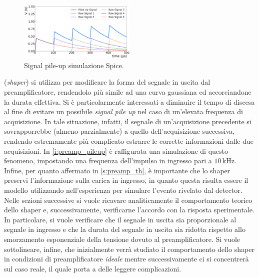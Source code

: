 \documentclass[a4paper,11pt]{article} %
\begin{document}
\begin{figure}
	\centering
	\includegraphics[width=0.5\textwidth]{../Plots/PreAmp/signal_pileup.png}
	\caption{\small Signal pile-up simulazione Spice.}
	\label{i:preamp_pileup}
\end{figure}

(\textit{shaper}) si utilizza per modificare la forma del segnale in uscita dal preamplificatore, rendendolo più simile
ad una curva gaussiana ed accorciandone la durata effettiva. Si è particolarmente interessati a diminuire il tempo di
discesa al fine di evitare un possibile \textit{signal pile up} nel caso di un'elevata frequenza di acquisizione. In
tale situazione, infatti, il segnale di un'acquisizione precedente si sovrapporrebbe (almeno parzialmente) a quello
dell'acquisizione successiva, rendendo estremamente più complicato estrarre le corrette informazioni dalle due
acquisizioni. In \autoref{i:preamp_pileup} è raffigurata una simulazione di questo fenomeno, impostando una frequenza
dell'impulso in ingresso pari a $10\,\si{\kilo\Hz}$. Infine, per quanto affermato in \autoref{s:preamp_th}, è importante
che lo shaper preservi l'informazione sulla carica in ingresso, in quanto questa risulta essere il modello utilizzando
nell'esperienza per simulare l'evento rivelato dal detector. Nelle sezioni successive si vuole ricavare analiticamente
il comportamento teorico dello shaper e, successivamente, verificarne l'accordo con la risposta sperimentale. In
particolare, si vuole verificare che il segnale in uscita sia proporzionale al segnale in ingresso e che la durata del
segnale in uscita sia ridotta rispetto allo smorzamento esponenziale della tensione dovuto al preamplificatore. Si vuole
sottolineare, infine, che inizialmente verrà studiato il comportamento dello shaper in condizioni di preamplificatore
\textit{ideale} mentre successivamente ci si concentrerà sul caso reale, il quale porta a delle leggere complicazioni.


\end{document}
